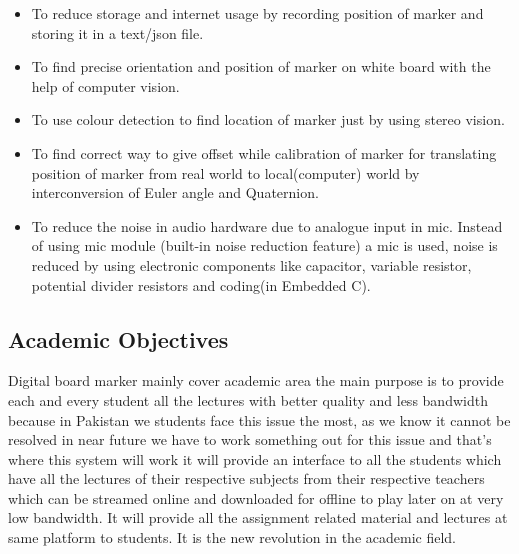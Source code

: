 \begin{itemize}

\item To reduce storage and internet usage by recording position of marker and storing it in a text/json file.
\item To find precise orientation and position of marker on white board with the help of computer vision.
\item To use colour detection to find location of marker just by using stereo vision.
\item To find correct way to give offset while calibration of marker for translating position of marker from real world to local(computer) world by interconversion of Euler angle and Quaternion.
\item To reduce the noise in audio hardware due to analogue input in mic. Instead of using mic module (built-in noise reduction feature) a mic is used, noise is reduced by using electronic components like capacitor, variable resistor, potential divider resistors and coding(in Embedded C).


\end{itemize}

\bigskip

\subsection{Academic Objectives}
Digital board marker mainly cover academic area the main purpose is to provide each and every student all the lectures with better quality and less bandwidth because in Pakistan we students face this issue the most, as we know it cannot be resolved in near future we have to work something out for this issue and that's where this system will work it will provide an interface to all the students which have all the lectures of their respective subjects from their respective teachers which can be streamed online and downloaded for offline to play later on at very low bandwidth. It will provide all the assignment related material and lectures at same platform to students. It is the new revolution in the academic field.

